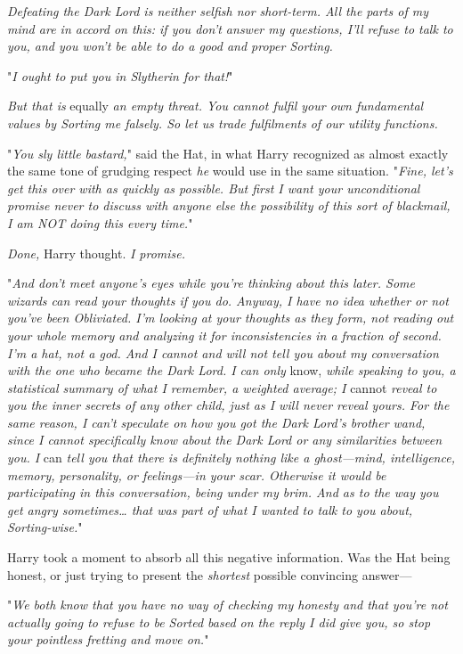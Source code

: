 \emph{Defeating the Dark Lord is neither selfish nor short-term. All the parts
of my mind are in accord on this: if you don't answer my questions, I'll refuse
to talk to you, and you won't be able to do a good and proper Sorting.}

"\emph{I ought to put you in Slytherin for that!}"

\emph{But that is} equally \emph{an empty threat. You cannot fulfil your own
fundamental values by Sorting me falsely. So let us trade fulfilments of our
utility functions.}

"\emph{You sly little bastard,}" said the Hat, in what Harry recognized as
almost exactly the same tone of grudging respect \emph{he} would use in the
same situation. "\emph{Fine, let's get this over with as quickly as possible.
But first I want your unconditional promise never to discuss with anyone else
the possibility of this sort of blackmail, I am NOT doing this every time.}"

\emph{Done,} Harry thought. \emph{I promise.}

"\emph{And don't meet anyone's eyes while you're thinking about this later.
Some wizards can read your thoughts if you do. Anyway, I have no idea whether
or not you've been Obliviated. I'm looking at your thoughts as they form, not
reading out your whole memory and analyzing it for inconsistencies in a
fraction of second. I'm a hat, not a god. And I cannot and will not tell you
about my conversation with the one who became the Dark Lord. I can only}
know, \emph{while speaking to you, a statistical summary of what I remember, a
weighted average; I} cannot \emph{reveal to you the inner secrets of any other
child, just as I will never reveal yours. For the same reason, I can't
speculate on how you got the Dark Lord's brother wand, since I cannot
specifically know about the Dark Lord or any similarities between you. I}
can \emph{tell you that there is definitely nothing like a ghost---mind,
intelligence, memory, personality, or feelings---in your scar. Otherwise it
would be participating in this conversation, being under my brim. And as to the
way you get angry sometimes{\ldots} that was part of what I wanted to talk to
you about, Sorting-wise.}"

Harry took a moment to absorb all this negative information. Was the Hat being
honest, or just trying to present the \emph{shortest} possible convincing
answer---

"\emph{We both know that you have no way of checking my honesty and that you're
not actually going to refuse to be Sorted based on the reply I did give you, so
stop your pointless fretting and move on.}"

